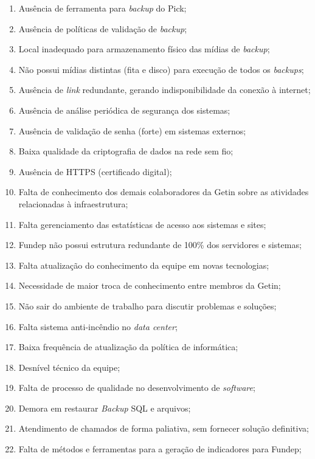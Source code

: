 \documentclass{article}
\begin{document}
\begin{enumerate}
    \item Ausência de ferramenta para \textit{backup} do Pick;
    \item Ausência de políticas de validação de \textit{backup};
    \item Local inadequado para armazenamento físico das mídias de \textit{backup};
    \item Não possui mídias distintas (fita e disco) para execução de todos os \textit{backups};
    \item Ausência de \textit{link} redundante, gerando indisponibilidade da conexão à internet;
    \item Ausência de análise periódica de segurança dos sistemas;
    \item Ausência de validação de senha (forte) em sistemas externos;
    \item Baixa qualidade da criptografia de dados na rede sem fio;
    \item Ausência de HTTPS (certificado digital);
    \item Falta de conhecimento dos demais colaboradores da Getin sobre as atividades relacionadas à infraestrutura;
    \item Falta gerenciamento das estatísticas de acesso aos sistemas e sites;
    \item Fundep não possui estrutura redundante de 100\% dos servidores e sistemas;
    \item Falta atualização do conhecimento da equipe em novas tecnologias;
    \item Necessidade de maior troca de conhecimento entre membros da Getin;
    \item Não sair do ambiente de trabalho para discutir problemas e soluções;
    \item Falta sistema anti-incêndio no \textit{data center};
    \item Baixa frequência de atualização da política de informática;
    \item Desnível técnico da equipe;
    \item Falta de processo de qualidade no desenvolvimento de \textit{software};
    \item Demora em restaurar \textit{Backup} SQL e arquivos;
    \item Atendimento de chamados de forma paliativa, sem fornecer solução definitiva;
    \item Falta de métodos e ferramentas para a geração de indicadores para Fundep;

\end{enumerate}
\end{document}
